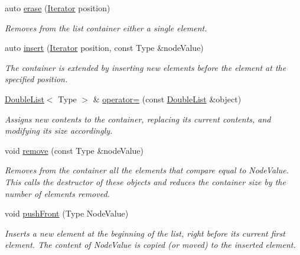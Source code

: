 \begin{DoxyCompactItemize}
\item 
auto \hyperlink{classDoubleList_a4c4e2442340bd76f3f73527012cf21dd}{erase} (\hyperlink{classDoubleList_1_1Iterator}{Iterator} position)
\begin{DoxyCompactList}\small\item\em Removes from the list container either a single element. \end{DoxyCompactList}\item 
auto \hyperlink{classDoubleList_a4fd49f28ae07fd52f6932f21d8604041}{insert} (\hyperlink{classDoubleList_1_1Iterator}{Iterator} position, const Type \&node\+Value)
\begin{DoxyCompactList}\small\item\em The container is extended by inserting new elements before the element at the specified position. \end{DoxyCompactList}\item 
\hyperlink{classDoubleList}{Double\+List}$<$ Type $>$ \& \hyperlink{classDoubleList_afe14167dc2c38016a1a03e5d72597d6a}{operator=} (const \hyperlink{classDoubleList}{Double\+List} \&object)
\begin{DoxyCompactList}\small\item\em Assigns new contents to the container, replacing its current contents, and modifying its size accordingly. \end{DoxyCompactList}\item 
void \hyperlink{classDoubleList_a58263ddfc70173f0d5a58c7e4af0e0f1}{remove} (const Type \&node\+Value)
\begin{DoxyCompactList}\small\item\em Removes from the container all the elements that compare equal to Node\+Value. This calls the destructor of these objects and reduces the container size by the number of elements removed. \end{DoxyCompactList}\item 
void \hyperlink{classDoubleList_acc64af7f09918c9b93bbb2e0acbe3b99}{push\+Front} (Type Node\+Value)
\begin{DoxyCompactList}\small\item\em Inserts a new element at the beginning of the list, right before its current first element. The content of Node\+Value is copied (or moved) to the inserted element. \end{DoxyCompactList}\item 
\mbox{\label{classDoubleList_ac2adea48c1884e2b521dae62708917ea}} 

\end{DoxyCompactItemize}
